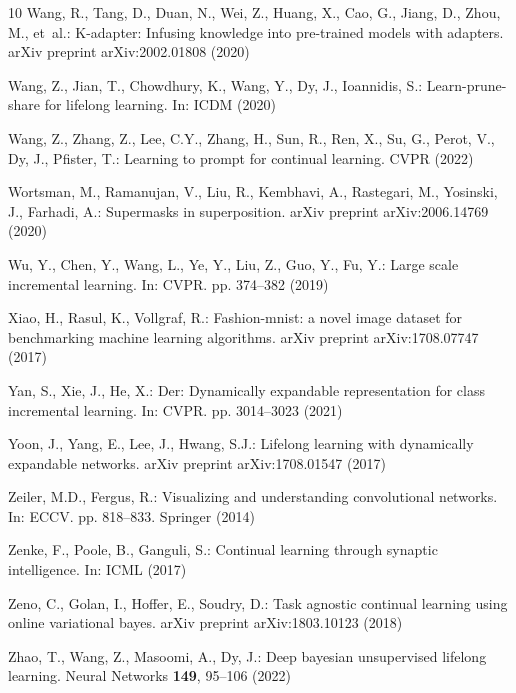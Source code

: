 \documentclass[runningheads]{llncs}
\begin{document}
\begin{thebibliography}{10}
Wang, R., Tang, D., Duan, N., Wei, Z., Huang, X., Cao, G., Jiang, D., Zhou, M.,
  et~al.: K-adapter: Infusing knowledge into pre-trained models with adapters.
  arXiv preprint arXiv:2002.01808  (2020)

Wang, Z., Jian, T., Chowdhury, K., Wang, Y., Dy, J., Ioannidis, S.:
  Learn-prune-share for lifelong learning. In: ICDM (2020)

Wang, Z., Zhang, Z., Lee, C.Y., Zhang, H., Sun, R., Ren, X., Su, G., Perot, V.,
  Dy, J., Pfister, T.: Learning to prompt for continual learning. CVPR  (2022)

Wortsman, M., Ramanujan, V., Liu, R., Kembhavi, A., Rastegari, M., Yosinski,
  J., Farhadi, A.: Supermasks in superposition. arXiv preprint arXiv:2006.14769
   (2020)

Wu, Y., Chen, Y., Wang, L., Ye, Y., Liu, Z., Guo, Y., Fu, Y.: Large scale
  incremental learning. In: CVPR. pp. 374--382 (2019)

Xiao, H., Rasul, K., Vollgraf, R.: Fashion-mnist: a novel image dataset for
  benchmarking machine learning algorithms. arXiv preprint arXiv:1708.07747
  (2017)

Yan, S., Xie, J., He, X.: Der: Dynamically expandable representation for class
  incremental learning. In: CVPR. pp. 3014--3023 (2021)

Yoon, J., Yang, E., Lee, J., Hwang, S.J.: Lifelong learning with dynamically
  expandable networks. arXiv preprint arXiv:1708.01547  (2017)

Zeiler, M.D., Fergus, R.: Visualizing and understanding convolutional networks.
  In: ECCV. pp. 818--833. Springer (2014)

Zenke, F., Poole, B., Ganguli, S.: Continual learning through synaptic
  intelligence. In: ICML (2017)

Zeno, C., Golan, I., Hoffer, E., Soudry, D.: Task agnostic continual learning
  using online variational bayes. arXiv preprint arXiv:1803.10123  (2018)

Zhao, T., Wang, Z., Masoomi, A., Dy, J.: Deep bayesian unsupervised lifelong
  learning. Neural Networks  \textbf{149},  95--106 (2022)

\end{thebibliography}
\end{document}
